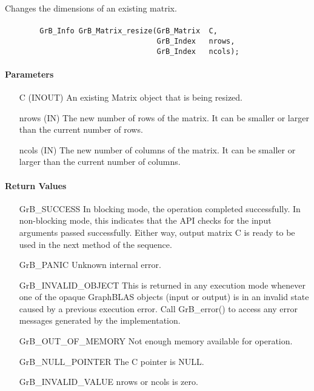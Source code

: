 Changes the dimensions of an existing matrix.

\paragraph{\syntax}

\begin{verbatim}
        GrB_Info GrB_Matrix_resize(GrB_Matrix  C,
                                   GrB_Index   nrows,
                                   GrB_Index   ncols);
\end{verbatim}

\paragraph{Parameters}

\begin{itemize}[leftmargin=1.1in]
    \item[{\sf C}] ({\sf INOUT}) An existing Matrix object that is being resized.
    \item[{\sf nrows}] ({\sf IN}) The new number of rows of the matrix. It can be smaller or larger than the current number of rows.
    \item[{\sf ncols}] ({\sf IN}) The new number of columns of the matrix. It can be smaller or larger than the current number of columns.
\end{itemize}

\paragraph{Return Values}

\begin{itemize}[leftmargin=2.1in]
    \item[{\sf GrB\_SUCCESS}]         In blocking mode, the operation completed
    successfully. In non-blocking mode, this indicates that the API checks 
    for the input arguments passed successfully. Either way, output matrix 
    {\sf C} is ready to be used in the next method of the sequence.

    \item[{\sf GrB\_PANIC}]           Unknown internal error.
    
    \item[{\sf GrB\_INVALID\_OBJECT}] This is returned in any execution mode 
    whenever one of the opaque GraphBLAS objects (input or output) is in an invalid 
    state caused by a previous execution error.  Call {\sf GrB\_error()} to access 
    any error messages generated by the implementation.

    \item[{\sf GrB\_OUT\_OF\_MEMORY}] Not enough memory available for operation.
    
    \item[{\sf GrB\_NULL\_POINTER}]  The {\sf C} pointer is {\sf NULL}.
    
    \item[{\sf GrB\_INVALID\_VALUE}] {\sf nrows} or {\sf ncols} is zero.
\end{itemize}

